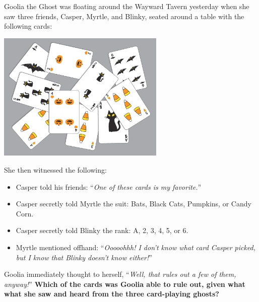 

Goolia the Ghost was floating around the Wayward Tavern yesterday when she
saw three friends, Casper, Myrtle, and Blinky, seated around a table with the
following cards:

\begin{center}
    \includegraphics[width=0.6\textwidth]{assets/kat/cardstogeth}
\end{center}

She then witnessed the following:

\begin{itemize}
  \item Casper told his friends:
        ``\textit{One of these cards is my favorite.}''
  \item Casper secretly told Myrtle the suit:
        Bats, Black Cats, Pumpkins, or Candy Corn.
  \item Casper secretly told Blinky the rank:
        A, 2, 3, 4, 5, or 6.
  \item Myrtle mentioned offhand:
        ``\textit{Ooooohhh! I don't know what card Casper picked, but I know
        that Blinky doesn't know either!}''
\end{itemize}

Goolia immediately thought to herself,
``\textit{Well, that rules out a few of them, anyway!}''
\textbf{Which of the cards was Goolia able to rule out, given what what
she saw and heard from the three card-playing ghosts?}

%
